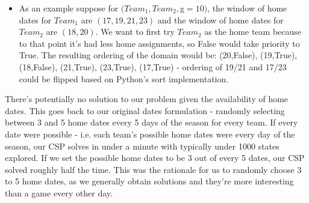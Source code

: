 \documentclass{article}
\begin{document}
\begin{enumerate}
		\begin{itemize}
			\item As an example suppose for $(Team_1,Team_2,$g$ =10)$, the window of home dates for $Team_1$ are $(17,19,21,23)$ and the window of home dates for $Team_2$ are $(18,20)$. We want to first try $Team_2$ as the home team because to that point it's had less home assignments, so False would take priority to True. The resulting ordering of the domain would be: (20,False), (19,True), (18,False), (21,True), (23,True), (17,True) - ordering of 19/21 and 17/23 could be flipped based on Python's sort implementation.
		\end{itemize}
	\end{enumerate}

	There's potentially no solution to our problem given the availability of home dates. This goes back to our original dates formulation - randomly selecting between 3 and 5 home dates every 5 days of the season for every team. If every date were possible - i.e. each team's possible home dates were every day of the season, our CSP solves in under a minute with typically under 1000 states explored. If we set the possible home dates to be 3 out of every 5 dates, our CSP solved roughly half the time. This was the rationale for us to randomly choose 3 to 5 home dates, as we generally obtain solutions and they're more interesting than a game every other day.
\end{document}
